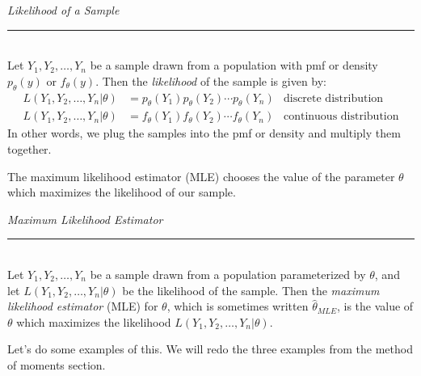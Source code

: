 \documentclass[notes.tex]{subfiles}
\begin{document}
\begin{framed}
\emph{Likelihood of a Sample}\\
  \rule{\dimexpr{}\fboxrule}{.1pt} \\
Let $Y_1, Y_2, \dots, Y_n$ be a sample drawn from a population with pmf or density $p_\theta(y)$ or $f_\theta(y)$. Then the \emph{likelihood} of the sample is given by:
\begin{align*}
L(Y_1, Y_2, \dots, Y_n|\theta) &= p_\theta(Y_1) p_\theta(Y_2) \cdots p_\theta(Y_n) & \text{discrete distribution}\\
L(Y_1, Y_2, \dots, Y_n|\theta) &= f_\theta(Y_1) f_\theta(Y_2) \cdots f_\theta(Y_n) & \text{continuous distribution}
\end{align*}
In other words, we plug the samples into the pmf or density and multiply them together.
\end{framed}
The maximum likelihood estimator (MLE) chooses the value of the parameter $\theta$ which maximizes the likelihood of our sample.
\begin{framed}
\emph{Maximum Likelihood Estimator}\\
  \rule{\dimexpr{}\fboxrule}{.1pt} \\
Let $Y_1, Y_2, \dots, Y_n$ be a sample drawn from a population parameterized by $\theta$, and let $L(Y_1, Y_2, \dots, Y_n|\theta)$ be the likelihood of the sample. Then the \emph{maximum likelihood estimator} (MLE) for $\theta$, which is sometimes written $\hat{\theta}_{MLE}$, is the value of $\theta$ which maximizes the likelihood $L(Y_1, Y_2, \dots, Y_n|\theta)$.
\end{framed}

Let's do some examples of this. We will redo the three examples from the method of moments section.
\end{document}
